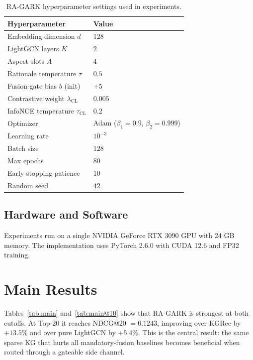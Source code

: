 \begin{table}[H]
\centering
\caption{RA-GARK hyperparameter settings used in experiments.}
\label{tab:hparams}
\begin{tabular}{ll}
\toprule
Hyperparameter & Value \\
\midrule
Embedding dimension $d$            & $128$ \\
LightGCN layers $K$                & $2$ \\
Aspect slots $A$                   & $4$ \\
Rationale temperature $\tau$       & $0.5$ \\
Fusion-gate bias $b$ (init)        & $+5$ \\
Contrastive weight $\lambda_{\mathrm{CL}}$ & $0.005$ \\
InfoNCE temperature $\tau_{\mathrm{CL}}$   & $0.2$ \\
Optimizer                          & Adam ($\beta_1{=}0.9$, $\beta_2{=}0.999$) \\
Learning rate                      & $10^{-3}$ \\
Batch size                         & $128$ \\
Max epochs                         & $80$ \\
Early-stopping patience            & $10$ \\
Random seed                        & $42$ \\
\bottomrule
\end{tabular}
\end{table}
\FloatBarrier

\subsection{Hardware and Software}
\label{sec:eval-env}

Experiments run on a single NVIDIA GeForce RTX 3090 GPU with $24$ GB memory. The implementation uses PyTorch 2.6.0 with CUDA 12.6 and FP32 training.

\section{Main Results}
\label{sec:eval-main}

Tables~\ref{tab:main} and~\ref{tab:main@10} show that RA-GARK is strongest at both cutoffs. At Top-20 it reaches NDCG@20 $=0.1243$, improving over KGRec by $+13.5\%$ and over pure LightGCN by $+5.4\%$. This is the central result: the same sparse KG that hurts all mandatory-fusion baselines becomes beneficial when routed through a gateable side channel.

